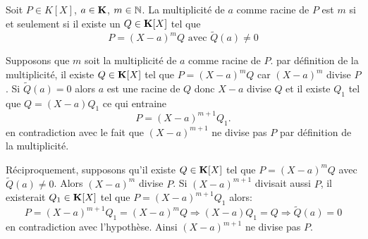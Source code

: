 \begin{propn}\label{mult1}
 Soit $P\in K[X]$, $a\in \mathbf{K}$, $m\in \mathbb{N}$. La multiplicité de $a$ comme racine de $P$ est $m$ si et seulement si il existe un $Q\in \mathbf{K}[X]$ tel que 
\begin{displaymath}
 P=(X-a)^m Q\text{ avec } \widetilde{Q}(a)\neq 0
\end{displaymath}
\end{propn}
\begin{demo}
Supposons que $m$ soit la multiplicité de $a$ comme racine de $P$. par définition de la multiplicité, il existe $Q\in \mathbf{K}[X]$ tel que $P=(X-a)^mQ$ car $(X-a)^m$ divise $P$. Si $\widetilde{Q}(a)=0$ alors $a$ est une racine de $Q$ donc $X-a$ divise $Q$ et il existe $Q_1$ tel que $Q=(X-a)Q_1$ ce qui entraine 
\[
 P = (X-a)^{m+1}Q_1.
\]
en contradiction avec le fait que $(X-a)^{m+1}$ ne divise pas $P$ par définition de la multiplicité.

Réciproquement, supposons qu'il existe $Q\in \mathbf{K}[X]$ tel que $P=(X-a)^{m}Q$ avec $\widetilde{Q}(a)\neq 0$. Alors $(X-a)^m$ divise $P$. Si $(X-a)^{m+1}$ divisait aussi $P$, il existerait $Q_1\in \mathbf{K}[X]$ tel que $P=(X-a)^{m+1}Q_1$ alors:
\[
 P = (X-a)^{m+1}Q_1 = (X-a)^{m}Q \Rightarrow (X-a)Q_1 = Q \Rightarrow \widetilde{Q}(a) = 0
\]
en contradiction avec l'hypothèse. Ainsi $(X-a)^{m+1}$ ne divise pas $P$.
\end{demo}


